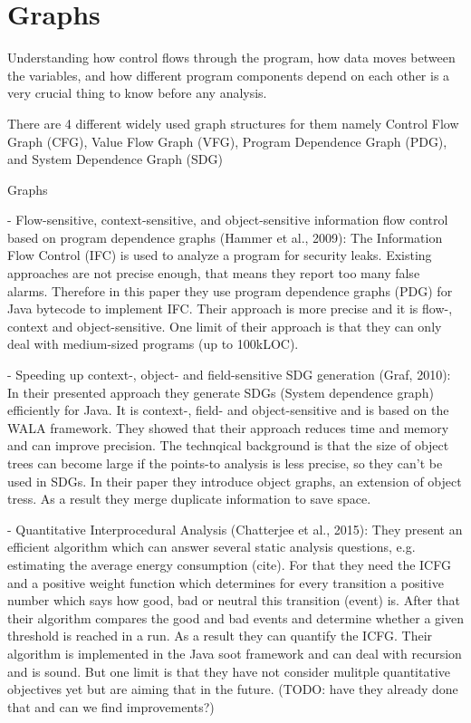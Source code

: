 \section{Graphs}
Understanding how control flows through the program, how data moves between the variables, and how different program components
depend on each other is a very crucial thing to know before any analysis.

There are 4 different widely used graph structures for them namely Control Flow Graph (CFG), Value Flow Graph (VFG), Program Dependence Graph (PDG), and System Dependence Graph (SDG)

Graphs

- Flow-sensitive, context-sensitive, and object-sensitive information flow control based on program dependence graphs (Hammer et al., 2009):
The Information Flow Control (IFC) is used to analyze a program for security leaks. Existing approaches are not precise enough, that means they report too many false alarms. Therefore in this paper 
they use program dependence graphs (PDG) for Java bytecode to implement IFC. Their approach is more precise and it is flow-, context and object-sensitive. One limit of their approach is that 
they can only deal with medium-sized programs (up to 100kLOC).

-  Speeding up context-, object- and field-sensitive SDG generation (Graf, 2010):  In their presented approach they generate SDGs (System dependence graph) efficiently for Java. It is context-, 
field- and object-sensitive and is based on the WALA framework. They showed that their approach reduces time and memory and can improve precision. The technqical background is that the size of object trees 
can become large if the points-to analysis is less precise, so they can't be used in SDGs. In their paper they introduce object graphs, an extension of object tress. As a result they merge duplicate information 
to save space. 

-  Quantitative Interprocedural Analysis (Chatterjee et al., 2015):  They present an efficient algorithm which can answer several static analysis questions, e.g. estimating the average energy consumption (cite).
For that they need the ICFG and a positive weight function which determines for every transition a positive number which says how good, bad or neutral this transition (event) is. 
After that their algorithm compares the good and bad events and determine whether a given threshold is reached in a run. As a result they can quantify the ICFG. Their algorithm is implemented in the Java soot framework 
and can deal with recursion and is sound. But one limit is that they have not consider mulitple quantitative objectives yet but are aiming that in the future. (TODO: have they already done that and can we find improvements?)

